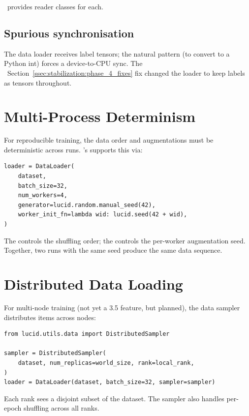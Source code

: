 \Lucid\ provides reader classes for each.

\subsection{Spurious synchronisation}
\label{ssec:data_pipeline:spurious_sync}

The data loader receives label tensors; the natural pattern
 (to convert to a Python int) forces a
device-to-CPU sync. The
~Section~\ref{ssec:stabilization:phase_4_fixes}
fix changed the loader to keep labels as tensors throughout.

\section{Multi-Process Determinism}
\label{sec:data_pipeline:determinism}

For reproducible training, the data order and augmentations
must be deterministic across runs. \Lucid's
 supports this via:

\begin{lstlisting}[style=lucid,language=LucidPython]
loader = DataLoader(
    dataset,
    batch_size=32,
    num_workers=4,
    generator=lucid.random.manual_seed(42),
    worker_init_fn=lambda wid: lucid.seed(42 + wid),
)
\end{lstlisting}

The  controls the shuffling order; the
 controls the per-worker augmentation
seed. Together, two runs with the same seed produce the same
data sequence.

\section{Distributed Data Loading}
\label{sec:data_pipeline:distributed}

For multi-node training (not yet a 3.5 feature, but planned),
the data sampler distributes items across nodes:

\begin{lstlisting}[style=lucid,language=LucidPython]
from lucid.utils.data import DistributedSampler

sampler = DistributedSampler(
    dataset, num_replicas=world_size, rank=local_rank,
)
loader = DataLoader(dataset, batch_size=32, sampler=sampler)
\end{lstlisting}

Each rank sees a disjoint subset of the dataset. The sampler
also handles per-epoch shuffling across all ranks.

